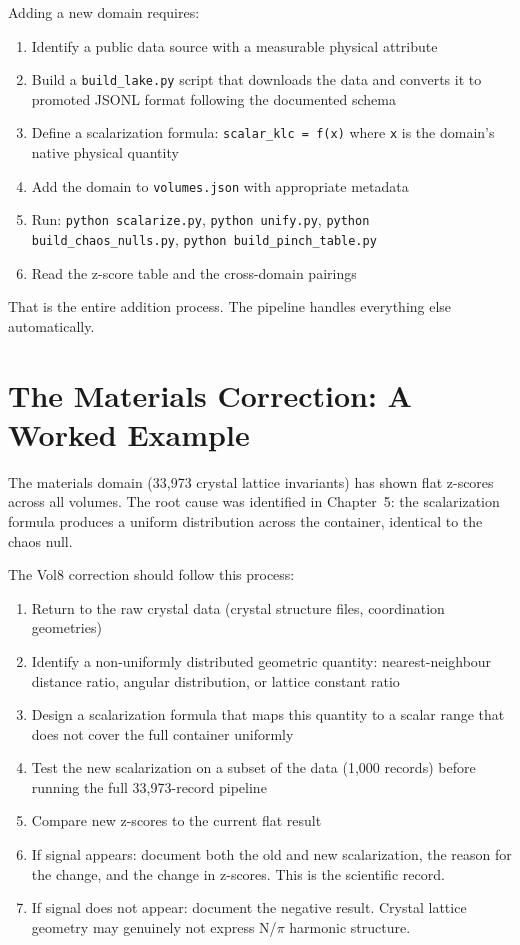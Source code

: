 \documentclass[11pt, letterpaper, openany]{book}
\begin{document}
Adding a new domain requires:

\begin{enumerate}
\item Identify a public data source with a measurable physical attribute
\item Build a \texttt{build\_lake.py} script that downloads the data and converts
      it to promoted JSONL format following the documented schema
\item Define a scalarization formula: \texttt{scalar\_klc = f(x)} where \texttt{x}
      is the domain's native physical quantity
\item Add the domain to \texttt{volumes.json} with appropriate metadata
\item Run: \texttt{python scalarize.py}, \texttt{python unify.py},
      \texttt{python build\_chaos\_nulls.py}, \texttt{python build\_pinch\_table.py}
\item Read the z-score table and the cross-domain pairings
\end{enumerate}

That is the entire addition process. The pipeline handles everything else automatically.

\section*{The Materials Correction: A Worked Example}

The materials domain (33,973 crystal lattice invariants) has shown flat z-scores across
all volumes. The root cause was identified in Chapter~5: the scalarization formula
produces a uniform distribution across the container, identical to the chaos null.

The Vol8 correction should follow this process:

\begin{enumerate}
\item Return to the raw crystal data (crystal structure files, coordination geometries)
\item Identify a non-uniformly distributed geometric quantity: nearest-neighbour
      distance ratio, angular distribution, or lattice constant ratio
\item Design a scalarization formula that maps this quantity to a scalar range
      that does not cover the full container uniformly
\item Test the new scalarization on a subset of the data (1,000 records) before
      running the full 33,973-record pipeline
\item Compare new z-scores to the current flat result
\item If signal appears: document both the old and new scalarization, the reason
      for the change, and the change in z-scores. This is the scientific record.
\item If signal does not appear: document the negative result. Crystal lattice
      geometry may genuinely not express N/$\pi$ harmonic structure.
\end{enumerate}
\end{document}
